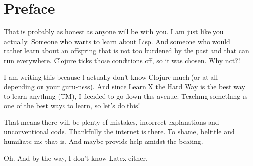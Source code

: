 \chapter{Preface}


That is probably as honest as anyone will be with you. I am just like you actually. Someone who wants to learn about Lisp. And someone who would rather learn about an offspring that is not too burdened by the past and that can run everywhere. Clojure ticks those conditions off, so it was chosen. Why not?!

I am writing this because I actually don't know Clojure much (or at-all depending on your guru-ness). And since Learn X the Hard Way is the best way to learn anything (TM), I decided to go down this avenue. Teaching something is one of the best ways to learn, so let's do this!

That means there will be plenty of mistakes, incorrect explanations and unconventional code. Thankfully the internet is there. To shame, belittle and humiliate me that is. And maybe provide help amidst the beating. 

Oh. And by the way, I don't know Latex either.